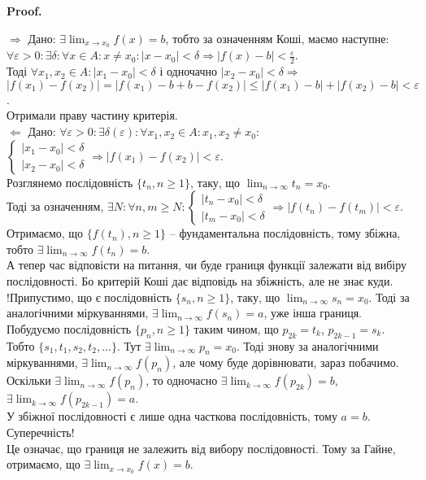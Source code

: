 \documentclass[a4paper, 14pt]{article}
\makeatletter
\def\qed{$\blacksquare$}
\def\rightproof{$\boxed{\Rightarrow}$ }
\def\leftproof{$\boxed{\Leftarrow}$ }
\theoremstyle{theoremdd}
\theoremstyle{theoremdd}
\theoremstyle{theoremdd}
\theoremstyle{theoremdd}
\theoremstyle{theoremdd}
\theoremstyle{theoremdd}
\theoremstyle{theoremdd}
\theoremstyle{theoremdd}
\renewenvironment{proof}[1][Proof.\\]{\par
\pushQED{\hfill \qed}%
\normalfont \topsep6\p@\@plus6\p@\relax
\trivlist
\item\relax
{\bfseries
#1\@addpunct{.}}\hspace\labelsep\ignorespaces
}{%
\popQED\endtrivlist\@endpefalse
}
\makeatother
\begin{document}
	\begin{proof}
\rightproof Дано: $\exists \displaystyle \lim_{x \to x_0} f(x) = b$, тобто за означенням Коші, маємо наступне:\\
$\forall \varepsilon > 0: \exists \delta: \forall x \in A: x \neq x_0: |x-x_0|<\delta \Rightarrow |f(x)-b|< \displaystyle \frac{\varepsilon}{2}$.\\
Тоді $\forall x_1, x_2 \in A: |x_1 - x_0| < \delta$ і одночачно $|x_2 - x_0| < \delta \Rightarrow$\\
$|f(x_1)-f(x_2)| = |f(x_1)-b + b - f(x_2)| \leq |f(x_1) - b| + |f(x_2)-b| < \varepsilon$.\\
Отримали праву частину критерія.
\bigskip \\
\leftproof Дано: $\forall \varepsilon > 0: \exists \delta(\varepsilon): \forall x_1,x_2 \in A: x_1,x_2 \neq x_0:$
$\begin{cases} |x_1-x_0|<\delta \\ |x_2-x_0|<\delta \end{cases} \Rightarrow |f(x_1)-f(x_2)|<\varepsilon$.\\
Розглянемо послідовність $\{t_n, n \geq 1\}$, таку, що $\displaystyle \lim_{n \to \infty} t_n = x_0$.\\
Тоді за означенням, $\exists N: \forall n,m \geq N: \begin{cases} |t_n-x_0|<\delta \\ |t_m-x_0|<\delta \end{cases} \Rightarrow |f(t_n)-f(t_m)|<\varepsilon$.\\
Отримаємо, що $\{f(t_n),n \geq 1\}$ -- фундаментальна послідовність, тому збіжна, тобто $\exists \displaystyle \lim_{n \to \infty} f(t_n) = b$.\\
А тепер час відповісти на питання, чи буде границя функції залежати від вибіру послідовності. Бо критерій Коші дає відповідь на збіжність, але не знає куди.\\
!Припустимо, що є послідовність $\{s_n, n \geq 1\}$, таку, що $\displaystyle \lim_{n \to \infty} s_n = x_0$. Тоді за аналогічними міркуваннями, $\exists \displaystyle \lim_{n \to \infty} f(s_n) = a$, уже інша границя.\\
Побудуємо послідовність $\{p_n, n \geq 1\}$ таким чином, що $p_{2k} = t_k$, $p_{2k-1} = s_k$. Тобто $\{s_1, t_1, s_2, t_2, \dots \}$. Тут $\exists \displaystyle \lim_{n \to \infty} p_n = x_0$. Тоді знову за аналогічними міркуваннями, $\exists \displaystyle \lim_{n \to \infty} f(p_n)$, але чому буде дорівнювати, зараз побачимо.\\
Оскільки $\exists \displaystyle \lim_{n \to \infty} f(p_n)$, то одночасно $\exists \displaystyle \lim_{k \to \infty} f(p_{2k}) = b$, $\exists \displaystyle \lim_{k \to \infty} f(p_{2k-1}) = a$.\\
У збіжної послідовності є лише одна часткова послідовність, тому $a = b$. Суперечність!\\
Це означає, що границя не залежить від вибору послідовності. Тому за Гайне, отримаємо, що $\exists \displaystyle \lim_{x \to x_0} f(x) = b$.
\end{proof}
\end{document}
